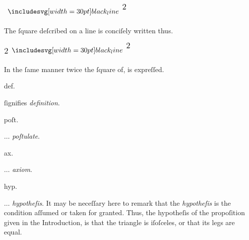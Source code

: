 \begin{minipage}[t]{0.20\textwidth}
    \begin{center}
        $\blackline^{\text{\large 2}}$
    \end{center}
\end{minipage}
\begin{minipage}[t]{0.80\textwidth}
    The ſquare deſcribed on a line is conciſely written thus.
\end{minipage}

\begin{minipage}[t]{0.20\textwidth}
    \begin{center}
        $\text{\large 2} \blackline^{\text{\large 2}}$
    \end{center}
\end{minipage}
\begin{minipage}[t]{0.80\textwidth}
    In the ſame manner twice the ſquare of, is expreſſed.
\end{minipage}

\begin{minipage}[t]{0.20\textwidth}
    \begin{center}
        def.
    \end{center}
\end{minipage}
\begin{minipage}[t]{0.80\textwidth}
    ſignifies \textit{definition}.
\end{minipage}

\begin{minipage}[t]{0.20\textwidth}
    \begin{center}
        poſt.
    \end{center}
\end{minipage}
\begin{minipage}[t]{0.80\textwidth}
    $\ldots$ \textit{poſtulate}.
\end{minipage}

\begin{minipage}[t]{0.20\textwidth}
    \begin{center}
        ax.
    \end{center}
\end{minipage}
\begin{minipage}[t]{0.80\textwidth}
    $\ldots$ \textit{axiom}.
\end{minipage}

\begin{minipage}[t]{0.20\textwidth}
    \begin{center}
        hyp.
    \end{center}
\end{minipage}
\begin{minipage}[t]{0.80\textwidth}
    $\ldots$ \textit{hypotheſis}. It may be neceſſary here to remark that the \textit{hypotheſis} is the condition aſſumed or taken for granted. Thus, the hypotheſis of the propoſition given in the Introduction, is that the triangle is iſoſceles, or that its legs are equal.
\end{minipage}

